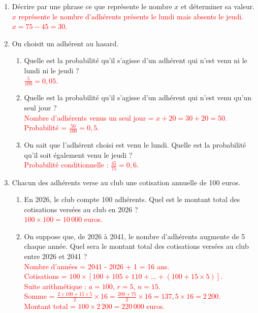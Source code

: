 \documentclass[11pt,a4paper]{article}
\newcommand{\reponse}[1]{\textcolor{red}{#1}}
\begin{document}
\begin{enumerate}
    \item Décrire par une phrase ce que représente le nombre $x$ et déterminer sa valeur. \\
    \reponse{$x$ représente le nombre d'adhérents présents le lundi mais absents le jeudi. $x = 75 - 45 = 30$.}

    \item On choisit un adhérent au hasard.
    \begin{enumerate}
        \item Quelle est la probabilité qu'il s'agisse d'un adhérent qui n'est venu ni le lundi ni le jeudi ? \\
        \reponse{$\frac{5}{100} = 0,05$.}

        \item Quelle est la probabilité qu'il s'agisse d'un adhérent qui n'est venu qu'un seul jour ? \\
        \reponse{Nombre d'adhérents venus un seul jour = $x + 20 = 30 + 20 = 50$. Probabilité = $\frac{50}{100} = 0,5$.}

        \item On sait que l'adhérent choisi est venu le lundi. Quelle est la probabilité qu'il soit également venu le jeudi ? \\
        \reponse{Probabilité conditionnelle : $\frac{45}{75} = 0,6$.}
    \end{enumerate}

    \item Chacun des adhérents verse au club une cotisation annuelle de 100 euros.
    \begin{enumerate}
        \item En 2026, le club compte 100 adhérents. Quel est le montant total des cotisations versées au club en 2026 ? \\
        \reponse{$100 \times 100 = 10\,000$ euros.}

        \item On suppose que, de 2026 à 2041, le nombre d'adhérents augmente de 5 chaque année. Quel sera le montant total des cotisations versées au club entre 2026 et 2041 ? \\
        \reponse{Nombre d'années = 2041 - 2026 + 1 = 16 ans. \\
        Cotisations = $100 \times [100 + 105 + 110 + \dots + (100 + 15 \times 5)]$. \\
        Suite arithmétique : $a = 100$, $r = 5$, $n = 15$. \\
        Somme = $\frac{2 \times 100 + 15 \times 5}{2} \times 16 = \frac{200 + 75}{2} \times 16 = 137,5 \times 16 = 2\,200$. \\
        Montant total = $100 \times 2\,200 = 220\,000$ euros.}
    \end{enumerate}
\end{enumerate}
\end{document}
